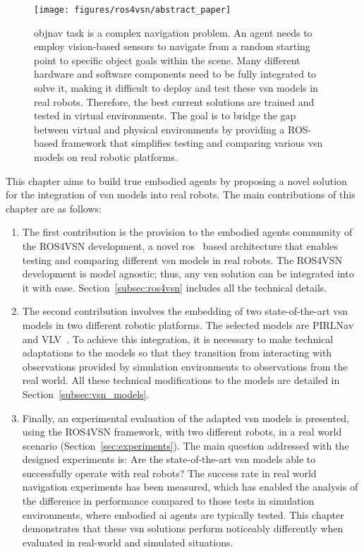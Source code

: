 \begin{figure}
    \centering
    \texttt{[image: figures/ros4vsn/abstract\_paper]}
    \caption[Object Goal Navigation diagram]{
        \acrshort{objnav} task is a complex navigation problem.
        An agent needs to employ vision-based sensors to navigate from a random starting point to specific object goals within the scene.
        Many different hardware and software components need to be fully integrated to solve it, making it difficult to deploy and test these \acrshort{vsn} models in real robots.
        Therefore, the best current solutions are trained and tested in virtual environments.
        The goal is to bridge the gap between virtual and physical environments by providing a ROS-based framework that simplifies testing and comparing various \acrshort{vsn} models on real robotic platforms.
    }
    \label{fig:abstract_ros4vsn}
\end{figure}

This chapter aims to build true embodied agents by proposing a novel solution for the integration of \acrshort{vsn} models into real robots.
The main contributions of this chapter are as follows:
\begin{enumerate}
    \item The first contribution is the provision to the embodied agents community of the ROS4VSN development, a novel \acrfull{ros}~\cite{ros} based architecture that enables testing and comparing different \acrshort{vsn} models in real robots.
    The ROS4VSN development is model agnostic; thus, any \acrshort{vsn} solution can be integrated into it with ease.
    Section~\ref{subsec:ros4vsn} includes all the technical details.
    \item The second contribution involves the embedding of two state-of-the-art \acrshort{vsn} models in two different robotic platforms.
    The selected models are PIRLNav~\cite{ramrakhya2023} and VLV~\cite{chang2020}.
    To achieve this integration, it is necessary to make technical adaptations to the models so that they transition from interacting with observations provided by simulation environments to observations from the real world.
    All these technical modifications to the models are detailed in Section~\ref{subsec:vsn_models}.
    \item Finally, an experimental evaluation of the adapted \acrshort{vsn} models is presented, using the ROS4VSN framework, with two different robots, in a real world scenario (Section~\ref{sec:experiments}).
    The main question addressed with the designed experiments is: Are the state-of-the-art \acrshort{vsn} models able to successfully operate with real robots?
    The success rate in real world navigation experiments has been measured, which has enabled the analysis of the difference in performance compared to those tests in simulation environments, where embodied \acrshort{ai} agents are typically tested.
    This chapter demonstrates that these \acrshort{vsn} solutions perform noticeably differently when evaluated in real-world and simulated situations.
\end{enumerate}


